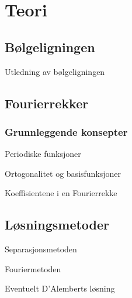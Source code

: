 \section{Teori}
\subsection{Bølgeligningen}
Utledning av bølgeligningen

\subsection{Fourierrekker}
\subsubsection{Grunnleggende konsepter}
Periodiske funksjoner

Ortogonalitet og basisfunksjoner

Koeffisientene i en Fourierrekke
\subsection{Løsningsmetoder}
Separasjonsmetoden

Fouriermetoden

Eventuelt D’Alemberts løsning
